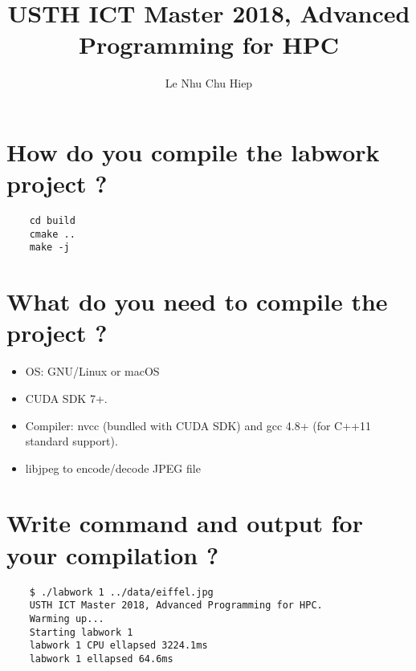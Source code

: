 \documentclass{article}
\title{USTH ICT Master 2018, Advanced Programming for HPC}
\author{Le Nhu Chu Hiep}
\date{}
\begin{document}
\section{How do you compile the labwork project ?}
 \begin{verbatim}
	cd build
	cmake ..
	make -j
 \end{verbatim}
\section{What do you need to compile the project ?}
 \begin{itemize}
	\item OS: GNU/Linux or macOS
	\item CUDA SDK 7+.
	\item Compiler: nvcc (bundled with CUDA SDK) and gcc 4.8+ (for C++11 standard support).									                 \item libjpeg to encode/decode JPEG file
 \end{itemize}
\section{Write command and output for your compilation ?}
 \begin{verbatim}
 	$ ./labwork 1 ../data/eiffel.jpg 
	USTH ICT Master 2018, Advanced Programming for HPC.
	Warming up...
	Starting labwork 1
	labwork 1 CPU ellapsed 3224.1ms
	labwork 1 ellapsed 64.6ms
 \end{verbatim}
\end{document}
